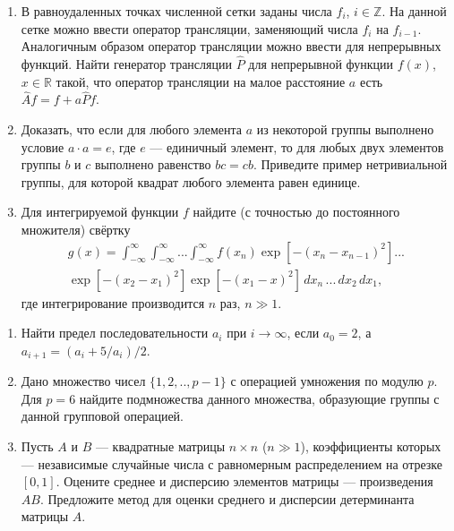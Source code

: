 \documentclass{book}
\begin{document}
\begin{enumerate}
    \item В равноудаленных точках численной сетки заданы числа $f_i$, $i \in \mathbb Z$.  На данной
        сетке можно ввести оператор трансляции, заменяющий числа $f_i$ на $f_{i - 1}$. Аналогичным
        образом оператор
        трансляции можно ввести для непрерывных функций. Найти генератор трансляции $\hat P$ для
        непрерывной функции $f(x)$, $x \in \mathbb R$ такой, что оператор трансляции на малое
        расстояние $a$ есть $\hat A f = f + a \hat P f$.
    \item Доказать, что если для любого элемента $a$ из некоторой группы выполнено условие $a \cdot
        a = e$, где $e$ --- единичный элемент, то для любых двух элементов группы $b$ и $c$
        выполнено равенство $bc = cb$. Приведите пример нетривиальной группы, для которой квадрат
        любого элемента равен единице.
    \item Для интегрируемой функции $f$ найдите (с точностью до постоянного множителя) свёртку
        \begin{multline}
            g(x) = \int_{-\infty}^\infty \int_{-\infty}^\infty ... \int_{-\infty}^\infty
            f(x_n) \exp\left[-(x_n - x_{n - 1})^2 \right] ...\\
            \exp\left[-(x_2 - x_1)^2 \right]
            \exp\left[-(x_1 - x)^2 \right]
            \, dx_n \, ... \, dx_2 \, dx_1,
        \end{multline}
        где интегрирование производится $n$ раз, $n \gg 1$.
\end{enumerate}

\begin{enumerate}
    \item Найти предел последовательности $a_i$ при $i \to \infty$, если $a_0 = 2$, а $a_{i + 1} =
        (a_i + 5 / a_i) / 2$.
    \item Дано множество чисел $\{1,2,..,p - 1\}$ с операцией умножения по модулю $p$.
        Для $p = 6$ найдите подмножества данного множества, образующие группы с данной групповой
        операцией.
    \item  Пусть $A$ и $B$ --- квадратные матрицы $n \times n$ ($n \gg 1$),
        коэффициенты которых --- независимые случайные числа с равномерным распределением на
        отрезке $[0, 1]$. Оцените среднее и дисперсию элементов матрицы --- произведения $A B$.
        Предложите метод для оценки среднего и дисперсии детерминанта матрицы $A$.
\end{enumerate}
\end{document}
